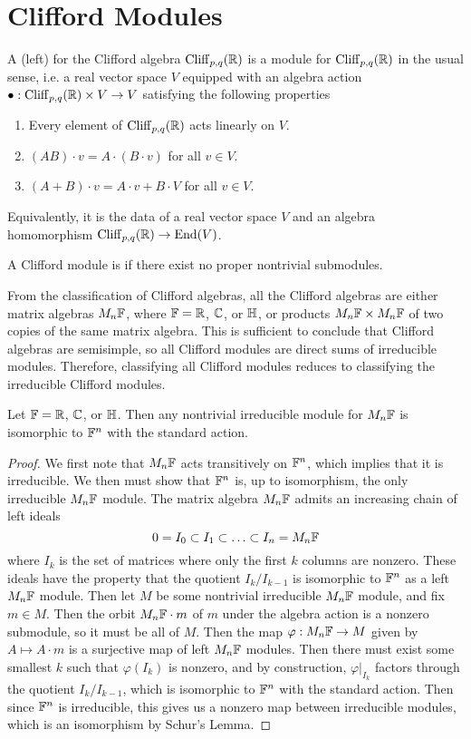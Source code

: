 %
\section{Clifford Modules}
%
\begin{defn}
 A (left)  for the Clifford algebra $\operatorname{Cliff}_{p,q}(\mathbb{R})$ is a module
 for $\operatorname{Cliff}_{p,q}(\mathbb{R})$ in the usual sense, i.e. a real vector space $V$ equipped
 with an algebra action $\bullet: \operatorname{Cliff}_{p,q}(\mathbb{R}) \times V \to V$ satisfying
 the following properties
 \begin{enumerate}
  \item Every element of $\operatorname{Cliff}_{p,q}(\mathbb{R})$ acts linearly on $V$.
  \item $(AB) \cdot v = A\cdot(B \cdot v)$ for all $v \in V$.
  \item $(A + B) \cdot v = A\cdot v + B\cdot V$ for all $v \in V$.
 \end{enumerate}
 Equivalently, it is the data of a real vector space $V$ and an algebra homomorphism
 $\operatorname{Cliff}_{p,q}(\mathbb{R}) \to \operatorname{End}(V)$.
\end{defn}
%
\begin{defn}
 A Clifford module is  if there exist no proper nontrivial submodules.
\end{defn}
%
From the classification of Clifford algebras, all the Clifford algebras are either
matrix algebras $M_n\mathbb{F}$, where $\mathbb{F} = \mathbb{R}$, $\mathbb{C}$, or $\mathbb{H}$, or products
$M_n\mathbb{F} \times M_n\mathbb{F}$ of two copies of the same matrix algebra. This is sufficient
to conclude that Clifford algebras are semisimple, so all Clifford modules
are direct sums of irreducible modules. Therefore, classifying all Clifford
modules reduces to classifying the irreducible Clifford modules.
%
\begin{thm}
 Let $\mathbb{F} = \mathbb{R}$, $\mathbb{C}$, or $\mathbb{H}$. Then any nontrivial irreducible module for
 $M_n\mathbb{F}$ is isomorphic to $\mathbb{F}^n$ with the standard action.
\end{thm}
%
\begin{proof}
 We first note that $M_n\mathbb{F}$ acts transitively on $\mathbb{F}^n$, which implies that
 it is irreducible. We then must show that $\mathbb{F}^n$ is, up to isomorphism, the only
 irreducible $M_n\mathbb{F}$ module. The matrix algebra $M_n\mathbb{F}$ admits an increasing
 chain of left ideals
 \[
  0 = I_0 \subset I_1 \subset \ldots \subset I_n = M_n\mathbb{F}
 \]
 where $I_k$ is the set of matrices where only the first $k$ columns are nonzero.
 These ideals have the property that the quotient $I_k / I_{k-1}$ is isomorphic
 to $\mathbb{F}^n$ as a left $M_n\mathbb{F}$ module. Then let $M$ be some nontrivial irreducible
 $M_n\mathbb{F}$ module, and fix $m \in M$. Then the orbit $M_n\mathbb{F} \cdot m$ of $m$
 under the algebra action is a nonzero submodule, so it must be all of $M$.
 Then the map $\varphi : M_n\mathbb{F} \to M$ given by $A \mapsto A \cdot m$ is
 a surjective map of left $M_n\mathbb{F}$ modules. Then there must exist some smallest
 $k$ such that $\varphi(I_k)$ is nonzero, and by construction,
 $\varphi\vert_{I_k}$ factors through the quotient $I_k / I_{k-1}$, which
 is isomorphic to $\mathbb{F}^n$ with the standard action. Then since $\mathbb{F}^n$ is irreducible,
 this gives us a nonzero map between irreducible modules, which is an isomorphism
 by Schur's Lemma.
\end{proof}
